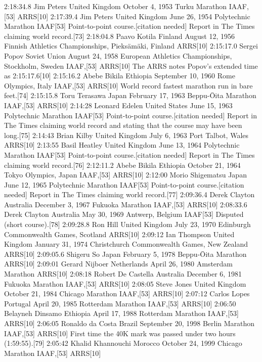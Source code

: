 2:18:34.8	Jim Peters	 United Kingdom	October 4, 1953	Turku Marathon	IAAF,[53] ARRS[10]	
2:17:39.4	Jim Peters	 United Kingdom	June 26, 1954	Polytechnic Marathon	IAAF[53]	Point-to-point course.[citation needed] Report in The Times claiming world record.[73]
2:18:04.8	Paavo Kotila	 Finland	August 12, 1956	Finnish Athletics Championships, Pieksämäki, Finland	ARRS[10]	
2:15:17.0	Sergei Popov	 Soviet Union	August 24, 1958	European Athletics Championships, Stockholm, Sweden	IAAF,[53] ARRS[10]	The ARRS notes Popov's extended time as 2:15:17.6[10]
2:15:16.2	Abebe Bikila	 Ethiopia	September 10, 1960	Rome Olympics, Italy	IAAF,[53] ARRS[10]	World record fastest marathon run in bare feet.[74]
2:15:15.8	Toru Terasawa	 Japan	February 17, 1963	Beppu-Ōita Marathon	IAAF,[53] ARRS[10]	
2:14:28	Leonard Edelen	 United States	June 15, 1963	Polytechnic Marathon	IAAF[53]	Point-to-point course.[citation needed] Report in The Times claiming world record and stating that the course may have been long.[75]
2:14:43	Brian Kilby	 United Kingdom	July 6, 1963	Port Talbot, Wales	ARRS[10]	
2:13:55	Basil Heatley	 United Kingdom	June 13, 1964	Polytechnic Marathon	IAAF[53]	Point-to-point course.[citation needed] Report in The Times claiming world record.[76]
2:12:11.2	Abebe Bikila	 Ethiopia	October 21, 1964	Tokyo Olympics, Japan	IAAF,[53] ARRS[10]	
2:12:00	Morio Shigematsu	 Japan	June 12, 1965	Polytechnic Marathon	IAAF[53]	Point-to-point course.[citation needed] Report in The Times claiming world record.[77]
2:09:36.4	Derek Clayton	 Australia	December 3, 1967	Fukuoka Marathon	IAAF,[53] ARRS[10]	
2:08:33.6	Derek Clayton	 Australia	May 30, 1969	Antwerp, Belgium	IAAF[53]	Disputed (short course).[78]
2:09:28.8	Ron Hill	 United Kingdom	July 23, 1970	Edinburgh Commonwealth Games, Scotland	ARRS[10]	
2:09:12	Ian Thompson	 United Kingdom	January 31, 1974	Christchurch Commonwealth Games, New Zealand	ARRS[10]	
2:09:05.6	Shigeru So	 Japan	February 5, 1978	Beppu-Ōita Marathon	ARRS[10]	
2:09:01	Gerard Nijboer	 Netherlands	April 26, 1980	Amsterdam Marathon	ARRS[10]	
2:08:18	Robert De Castella	 Australia	December 6, 1981	Fukuoka Marathon	IAAF,[53] ARRS[10]	
2:08:05	Steve Jones	 United Kingdom	October 21, 1984	Chicago Marathon	IAAF,[53] ARRS[10]	
2:07:12	Carlos Lopes	 Portugal	April 20, 1985	Rotterdam Marathon	IAAF,[53] ARRS[10]	
2:06:50	Belayneh Dinsamo	 Ethiopia	April 17, 1988	Rotterdam Marathon	IAAF,[53] ARRS[10]	
2:06:05	Ronaldo da Costa	 Brazil	September 20, 1998	Berlin Marathon	IAAF,[53] ARRS[10]	First time the 40K mark was passed under two hours (1:59:55).[79]
2:05:42	Khalid Khannouchi	 Morocco	October 24, 1999	Chicago Marathon	IAAF,[53] ARRS[10]	
